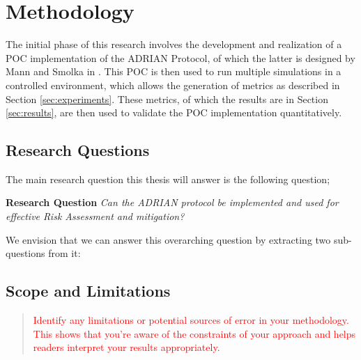 \section{Methodology}
\label{sec:methodology}
The initial phase of this research involves the development and realization of a POC implementation of the ADRIAN Protocol, of which the latter is designed by Mann and Smolka in \cite{mann2023ADRIAN}. This POC is then used to run multiple simulations in a controlled environment, which allows the generation of metrics as described in Section \ref{sec:experiments}. These metrics, of which the results are in Section \ref{sec:results}, are then used to validate the POC implementation quantitatively. 


\subsection{Research Questions}
\label{ssec:research-questions}

The main research question this thesis will answer is the following question;

\vspace{0.5em}
\textbf{Research Question}\label{rq} \emph{Can the ADRIAN protocol be implemented and used for effective Risk Assessment and mitigation?}\vspace{1em}

We envision that we can answer this overarching question by extracting two sub-questions from it:



\subsection{Scope and Limitations}
\label{ssec:scope-limitations}
\begin{quote}\textcolor{red}{
    Identify any limitations or potential sources of error in your methodology. This shows that you're aware of the constraints of your approach and helps readers interpret your results appropriately.
}\end{quote}
